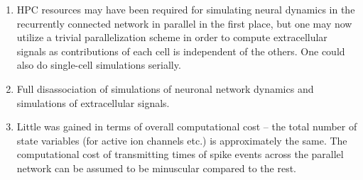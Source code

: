 \begin{enumerate}
\item HPC resources may have been required for simulating neural dynamics in the recurrently connected network in parallel in the first place, 
but one may now utilize a trivial parallelization scheme in order to compute extracellular signals as contributions of each cell is independent of the others. 
One could also do single-cell simulations serially. 
\item Full disassociation of simulations of neuronal network dynamics and simulations of extracellular signals. 
\item Little was gained in terms of overall computational cost -- the total number of state variables (for active ion channels etc.) is approximately the same. 
The computational cost of transmitting times of spike events across the parallel network can be assumed to be minuscular compared to the rest.
\end{enumerate}

